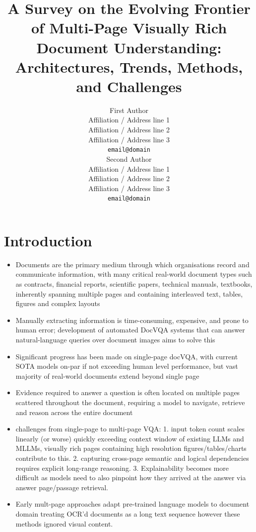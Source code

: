 \documentclass[11pt]{article}
\title{A Survey on the Evolving Frontier of Multi-Page Visually Rich Document Understanding: Architectures, Trends, Methods, and Challenges}
\author{First Author \\
  Affiliation / Address line 1 \\
  Affiliation / Address line 2 \\
  Affiliation / Address line 3 \\
  \texttt{email@domain} \\\And
  Second Author \\
  Affiliation / Address line 1 \\
  Affiliation / Address line 2 \\
  Affiliation / Address line 3 \\
  \texttt{email@domain} \\}
\begin{document}
\maketitle
\begin{abstract}
\end{abstract}

\section{Introduction}

\begin{itemize}
    \item Documents are the primary medium through which organisations record and communicate information, with many critical real-world document types such as contracts, financial reports, scientific papers, technical manuals, textbooks, inherently spanning multiple pages and containing interleaved text, tables, figures and complex layouts \cite{tito2023hierarchical, borchmann2025arctic}
    \item Manually extracting information is time-consuming, expensive, and prone to human error; development of automated DocVQA systems that can answer natural-language queries over document images aims to solve this
    \item Significant progress has been made on single-page docVQA, with current SOTA models on-par if not exceeding human level performance, but vast majority of real-world documents extend beyond single page \cite{tito2023hierarchical}
    \item Evidence required to answer a question is often located on multiple pages scattered throughout the document, requiring a model to navigate, retrieve and reason across the entire document \cite{blau2024gram, borchmann2025arctic}
    \item challenges from single-page to multi-page VQA: 1. input token count scales linearly (or worse) quickly exceeding context window of existing LLMs and MLLMs, visually rich pages containing high resolution figures/tables/charts contribute to this. 2. capturing cross-page semantic and logical dependencies requires explicit long-range reasoning. 3. Explainability becomes more difficult as models need to also pinpoint how they arrived at the answer via answer page/passage retrieval.
    \item Early mult-page approaches adapt pre-trained language models to document domain treating OCR'd documents as a long text sequence however these methods ignored visual content.

\end{itemize}
\end{document}
